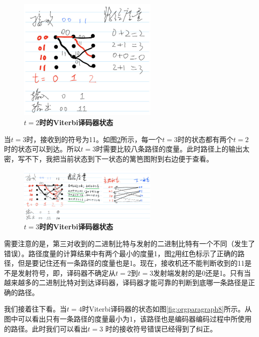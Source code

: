 \documentclass[10pt,a4paper,UTF8]{article}
\begin{document}
\begin{figure}[htb]
\centering
\includegraphics[width=0.6\textwidth]{../../img/20160101ViterbiT1.jpg}
\caption{\label{fig:orgparagraph6}
\textbf{\(t=2\)时的Viterbi译码器状态}}
\end{figure}

当\(t=3\)时，接收到的符号为11。如图\ref{fig:orgparagraph7}所示，每一个\(t=3\)时的状态都有两个\(t=2\)时的状态可以到达。所以\(t=3\)时需要比较八条路径的度量。此时路径上的输出太密，写不下，我把当前状态到下一状态的篱笆图附到右边便于查看。

\begin{figure}[htb]
\centering
\includegraphics[width=0.6\textwidth]{../../img/20160101ViterbiT3.jpg}
\caption{\label{fig:orgparagraph7}
\textbf{\(t=3\)时的Viterbi译码器状态}}
\end{figure}

需要注意的是，第三对收到的二进制比特与发射的二进制比特有一个不同（发生了错误）。路径度量的计算结果中有两个最小的度量1，图\ref{fig:orgparagraph7}用红色标示了正确的路径，但是要记住还有一条路径的度量也是1。现在，接收机还不能判断收到的11是不是发射符号，即，译码器不确定从\(t=2\)到\(t=3\)发射端发射的是0还是1。只有当越来越多的二进制比特对到达译码器，译码器才能可靠的判断到底哪一条路径是正确的路径。

我们接着往下看。当\(t=4\)时Viterbi译码器的状态如图\ref{fig:orgparagraph8}所示。从图中可以看出只有一条路径的度量最小为1，该路径也是编码器编码过程中所使用的路径。此时我们可以看出\(t=3\) 时的接收符号错误已经得到了纠正。
\end{document}
